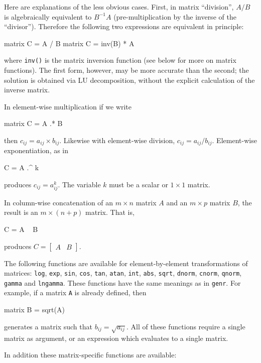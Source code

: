 Here are explanations of the less obvious cases.  First, in matrix
``division'', $A/B$ is algebraically equivalent to $B^{-1}A$
(pre-multiplication by the inverse of the ``divisor'').  Therefore the
following two expressions are equivalent in principle:
%
\begin{code}
matrix C = A / B
matrix C = inv(B) * A
\end{code}
%
where \texttt{inv()} is the matrix inversion function (see below for
more on matrix functions).  The first form, however, may be more
accurate than the second; the solution is obtained via LU
decomposition, without the explicit calculation of the inverse matrix.

In element-wise multiplication if we write
%
\begin{code}
matrix C = A .* B
\end{code}
% 
then $c_{ij} = a_{ij} \times b_{ij}$.  Likewise with element-wise
division, $c_{ij} = a_{ij}/b_{ij}$. Element-wise exponentiation, as in
%
\begin{code}
C = A .^ k
\end{code}
% 
produces $c_{ij} = a_{ij}^k$.  The variable $k$ must be a scalar or
$1\times 1$ matrix.

In column-wise concatenation of an $m\times n$ matrix $A$ and
an $m\times p$ matrix $B$, the result is an $m\times (n+p)$ matrix.
That is,
%
\begin{code}
C = A ~ B
\end{code}
% 
produces $C = \left[ \begin{array}{cc} A & B \end{array} \right]$.

The following functions are available for element-by-element
transformations of matrices: \texttt{log}, \texttt{exp}, \texttt{sin},
\texttt{cos}, \texttt{tan}, \texttt{atan}, \texttt{int}, \texttt{abs},
\texttt{sqrt}, \texttt{dnorm}, \texttt{cnorm}, \texttt{qnorm},
\texttt{gamma} and \texttt{lngamma}.  These functions have the same
meanings as in \texttt{genr}.  For example, if a matrix \texttt{A} is
already defined, then
%
\begin{code}
matrix B = sqrt(A)
\end{code}
%
generates a matrix such that $b_{ij} = \sqrt{a_{ij}}$.  All of these
functions require a single matrix as argument, or an expression which
evaluates to a single matrix.

In addition these matrix-specific functions are available:

